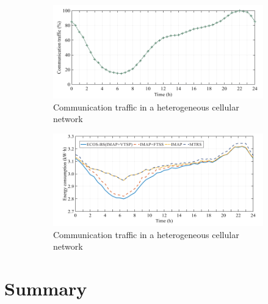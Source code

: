 \documentclass[11pt,a4paper]{article}
\begin{document}
\begin{figure}[ht]
  \begin{subfigure}{\linewidth}
    
    \includegraphics[width=\linewidth]{img/CommTraffic.png}
    \caption{Communication traffic in a heterogeneous cellular network \citep{EnergyOptimization}}\label{subfig:commtrafic}
  \end{subfigure}
  \begin{subfigure}{\linewidth}
    
    \includegraphics[width=\linewidth]{img/CommTrafficSleep.png}
    \caption{Communication traffic in a heterogeneous cellular network \citep{EnergyOptimization}}\label{subfig:sleepmodes}
  \end{subfigure}
  \caption{}\label{fig:traffic}
\end{figure}

\section{Summary}\label{sec:conclusion}
\end{document}
